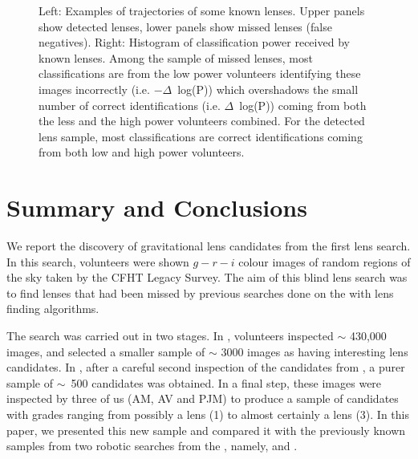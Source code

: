 \documentclass[useAMS,usenatbib,a4paper]{mn2e}
\begin{document}
\begin{figure}
\begin{center}
\caption{ \label{fig:detmis}
Left: Examples of \StageOne trajectories of some known lenses.
Upper panels show detected
lenses, lower panels show missed lenses (false negatives). Right:
Histogram of classification power received by known lenses.
Among the sample of missed
lenses, most classifications are from the low power volunteers
identifying these images incorrectly (i.e. $-\Delta$~log(P)) which
overshadows the small number of correct identifications (i.e.
$\Delta$~log(P)) coming from both the less and the high power volunteers
combined. For the detected lens sample, most classifications are correct
identifications coming from both low and high power volunteers.
}
\end{center}
\end{figure}



\section{Summary and Conclusions}
\label{sec:conclude}

We report the discovery of gravitational lens candidates from the
first \sw lens search. In this search, volunteers were shown $g-r-i$
colour images of random regions of the sky taken by the CFHT Legacy
Survey. The aim of this blind lens search was to find lenses that had
been missed by previous searches done on the \cfhtls with lens finding
algorithms.

The search was carried out in two stages.  In \StageOne, volunteers
inspected $\sim$ 430,000 images, and selected a smaller sample of $\sim$
3000 images as having interesting lens candidates. In \StageTwo, after a
careful second inspection of the candidates from \StageOne, a purer
sample of $\sim$~500 candidates was obtained. In a final step, these
images were inspected by three of us (AM, AV and PJM) to produce a
sample of candidates with grades ranging from possibly a lens (1) to
almost certainly a lens (3).  In this paper, we presented this new \sw
sample and compared it with the previously known samples from two
robotic searches from the \cfhtls, namely, \rf and \af.
\end{document}
